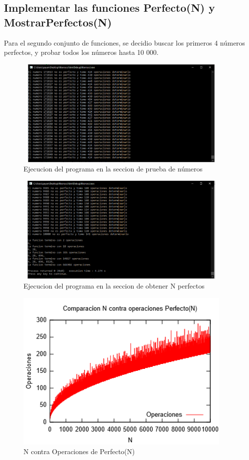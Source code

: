 \documentclass[spanish]{article}
\begin{document}
		\subsection{Implementar las funciones Perfecto(N) y MostrarPerfectos(N)}
			Para el segundo conjunto de funciones, se decidio buscar los primeros 4 números perfectos, y probar todos los números hasta 10 000.
			\begin{figure}[H]
				\centering
				\includegraphics[width=400px,height=200px]{ejecucionSegundaParte}
				\caption{Ejecucion del programa en la seccion de prueba de números}
			\end{figure}
			\begin{figure}[H]
				\centering
				\includegraphics[width=400px,height=200px]{ejecucionTerceraParte}
				\caption{Ejecucion del programa en la seccion de obtener N perfectos}
			\end{figure}
			\begin{figure}[h!]
				\centering
				\includegraphics[width=400px,height=300px]{grafica5}
				\caption{N contra Operaciones de Perfecto(N)}
			\end{figure}
\end{document}
